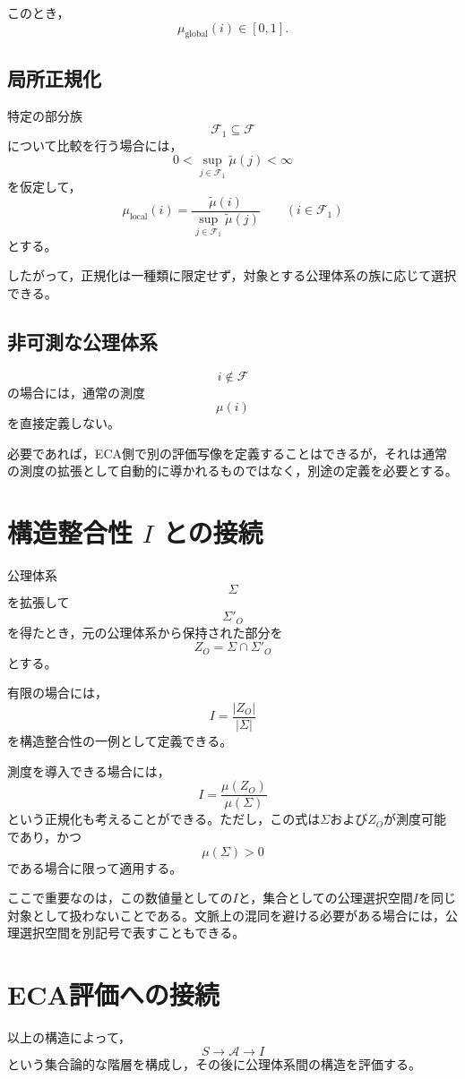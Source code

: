 \documentclass[12pt,a4paper]{article}
\begin{document}
このとき，
\[
\mu_{\mathrm{global}}(i)\in[0,1].
\]

\subsection{局所正規化}

特定の部分族
\[
\mathcal F_1\subseteq\mathcal F
\]
について比較を行う場合には，
\[
0<
\sup_{j\in\mathcal F_1}\widetilde\mu(j)
<\infty
\]
を仮定して，
\[
\mu_{\mathrm{local}}(i)
=
\frac{\widetilde\mu(i)}
{\sup_{j\in\mathcal F_1}\widetilde\mu(j)}
\qquad
(i\in\mathcal F_1)
\]
とする。

したがって，正規化は一種類に限定せず，対象とする公理体系の族に応じて選択できる。

\subsection{非可測な公理体系}

\[
i\notin\mathcal F
\]
の場合には，通常の測度
\[
\mu(i)
\]
を直接定義しない。

必要であれば，ECA側で別の評価写像を定義することはできるが，それは通常の測度の拡張として自動的に導かれるものではなく，別途の定義を必要とする。

\section{構造整合性 $I$ との接続}

公理体系
\[
\Sigma
\]
を拡張して
\[
\Sigma'_O
\]
を得たとき，元の公理体系から保持された部分を
\[
Z_O=\Sigma\cap\Sigma'_O
\]
とする。

有限の場合には，
\[
I=
\frac{|Z_O|}{|\Sigma|}
\]
を構造整合性の一例として定義できる。

測度を導入できる場合には，
\[
I=
\frac{\mu(Z_O)}{\mu(\Sigma)}
\]
という正規化も考えることができる。ただし，この式は$\Sigma$および$Z_O$が測度可能であり，かつ
\[
\mu(\Sigma)>0
\]
である場合に限って適用する。

ここで重要なのは，この数値量としての$I$と，集合としての公理選択空間$I$を同じ対象として扱わないことである。文脈上の混同を避ける必要がある場合には，公理選択空間を別記号で表すこともできる。

\section{ECA評価への接続}

以上の構造によって，
\[
S
\longrightarrow
\mathscr A
\longrightarrow
I
\]
という集合論的な階層を構成し，その後に公理体系間の構造を評価する。
\end{document}
